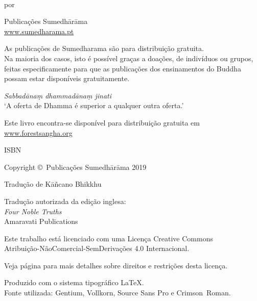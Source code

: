 \cleartoverso
\thispagestyle{empty}

{\copyrightsize
\centering
\setlength{\parindent}{0pt}%
\setlength{\parskip}{0.8\baselineskip}%

\thetitle\\
por \theauthor


Publicações Sumedhārāma\\
\href{http://sumedharama.pt}{www.sumedharama.pt}

As publicações de Sumedharama são para distribuição gratuita.\\ 
Na maioria dos casos, isto é possível graças a doações, de indivíduos ou grupos,
feitas especificamente para que as publicações dos ensinamentos do Buddha possam
estar disponíveis gratuitamente.

\textit{Sabbadānaṃ dhammadānaṃ jinati}\\
`A oferta de Dhamma é superior a qualquer outra oferta.'

Este livro encontra-se disponível para distribuição gratuita em\\
\href{https://forestsangha.org/}{www.forestsangha.org}

ISBN \theISBN

Copyright \copyright\ Publicações Sumedhārāma 2019

Tradução de Kāñcano Bhikkhu


Tradução autorizada da edição inglesa:\\
\emph{Four Noble Truths}\\
Amaravati Publications

\vfill

{\footnotesize

Este trabalho está licenciado com uma Licença Creative Commons\\
Atribuição-NãoComercial-SemDerivações 4.0 Internacional.

Veja página \pageref{copyright-details} para mais detalhes sobre direitos e restrições desta licença.

Produzido com o sistema tipográfico \LaTeX.\\
Fonte utilizada: Gentium, Vollkorn, Source Sans Pro e Crimson~Roman.

\theEditionInfo

}}
